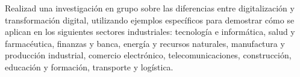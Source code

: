
%
%
%


\clearpage
{}
Realizad una investigación en grupo sobre las diferencias entre digitalización y transformación digital, utilizando ejemplos específicos para demostrar cómo se aplican en los siguientes sectores industriales: tecnología e informática, salud y farmacéutica, finanzas y banca, energía y recursos naturales, manufactura y producción industrial, comercio electrónico, telecomunicaciones, construcción, educación y formación, transporte y logística.

